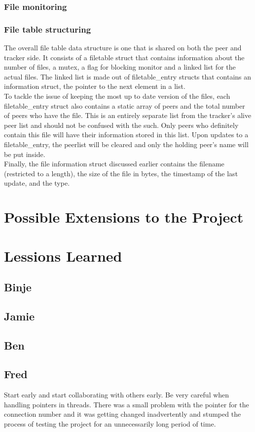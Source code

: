 \documentclass[12pt]{article}
\begin{document}
\subsubsection {File monitoring}

\subsubsection {File table structuring}
\indent\indent The overall file table data structure is one that is shared on both the peer and tracker side. It consists of a filetable struct that contains information about the number of files, a mutex, a flag for blocking monitor and a linked list for the actual files. The linked list is made out of filetable\_entry structs that contains an information struct, the pointer to the next element in a list. \\
\indent To tackle the issue of keeping the most up to date version of the files, each filetable\_entry struct also contains a static array of peers and the total number of peers who have the file. This is an entirely separate list from the tracker's alive peer list and should not be confused with the such. Only peers who definitely contain this file will have their information stored in this list. Upon updates to a filetable\_entry, the peerlist will be cleared and only the holding peer's name will be put inside. \\
\indent Finally, the file information struct discussed earlier contains the filename (restricted to a length), the size of the file in bytes, the timestamp of the last update, and the type. 


\section{Possible Extensions to the Project}\label{results}

\section{Lessions Learned}\label{conclusions}
\subsection {Binje}
\indent\indent 
\subsection {Jamie}
\indent\indent 
\subsection {Ben}
\indent\indent 
\subsection {Fred}
\indent\indent Start early and start collaborating with others early. Be very careful when handling pointers in threads. There was a small problem with the pointer for the connection number and it was getting changed inadvertently and stumped the process of testing the project for an unnecessarily long period of time.
\end{document}
